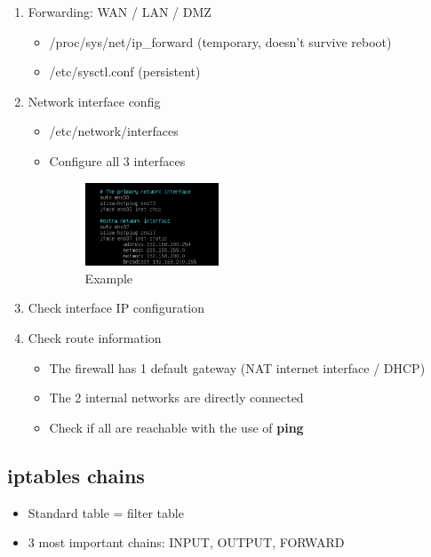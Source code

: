 \documentclass{article}
\begin{document}
\begin{enumerate}
    \item Forwarding: WAN / LAN / DMZ
    \begin{itemize}
        \item /proc/sys/net/ip\_forward (temporary, doesn't survive reboot)
        \item /etc/sysctl.conf (persistent)
    \end{itemize}
    \item Network interface config
    \begin{itemize}
        \item /etc/network/interfaces
        \item Configure all 3 interfaces
        \begin{figure}[H]
            \centering
            \includegraphics[width=0.4\textwidth]{etc-network-interfaces.png}
            \caption{Example}
        \end{figure}
    \end{itemize}
    \item Check interface IP configuration
    \item Check route information
    \begin{itemize}
        \item The firewall has 1 default gateway (NAT internet interface / DHCP)
        \item The 2 internal networks are directly connected
        \item Check if all are reachable with the use of \textbf{ping}
    \end{itemize}
\end{enumerate}

\subsection{iptables chains}

\begin{itemize}
    \item Standard table = filter table
    \item 3 most important chains: INPUT, OUTPUT, FORWARD
\end{itemize}
\end{document}

